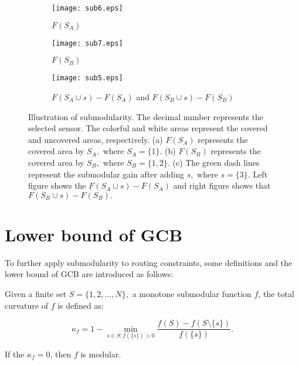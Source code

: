 \begin{figure}[htbp]
 \begin{center}
\begin{subfigure}{.22\textwidth}
  \centering
  \texttt{[image: sub6.eps]}
  \caption{$F(S_A)$}
\end{subfigure}
\begin{subfigure}{.22\textwidth}
  \centering
  \texttt{[image: sub7.eps]}
  \caption{$F(S_B)$}
\end{subfigure}
\begin{subfigure}{.44\textwidth}
  \centering
  \texttt{[image: sub5.eps]}
  \caption{$F(S_A \cup s)-F(S_A)$ and $F(S_B \cup s)-F(S_B)$}
\end{subfigure}
\caption{Illustration of submodularity. The decimal number represents the selected sensor.
The colorful and white areas represent the covered and uncovered areas, respectively.
(a) $F(S_A)$ represents the covered area by $S_A,$ where $S_A = \{1\}.$ (b) $F(S_B)$ represents the covered area by $S_B,$ where $S_B = \{1, 2\}.$
(c) The green dash lines represent the submodular gain after adding $s,$ where $s = \{3\}.$ Left figure shows the $F(S_A\cup s) - F(S_A)$ and right figure shows that $F(S_B\cup s) - F(S_B).$}
\label{fig:submodularity}
 \end{center}
 \end{figure}

\section{Lower bound of GCB}
To further apply submodularity to routing constraints,
some definitions and the lower bound of GCB are introduced as follows:

\begin{definition}
Given a finite set $S = \{1,2,...,N\},$
a monotone submodular function $f$, the total curvature of $f$ is defined as:

\begin{equation}
\kappa_f = 1 - \min_{s\in S:f(\{ s \}) > 0}\frac{f(S)-f(S \setminus\{ s \})}{f(\{ s \})}.
\label{eq:kappa}
\end{equation}

If the $\kappa_f = 0$, then $f$ is modular.
\label{def:kappa_f}
\end{definition}


